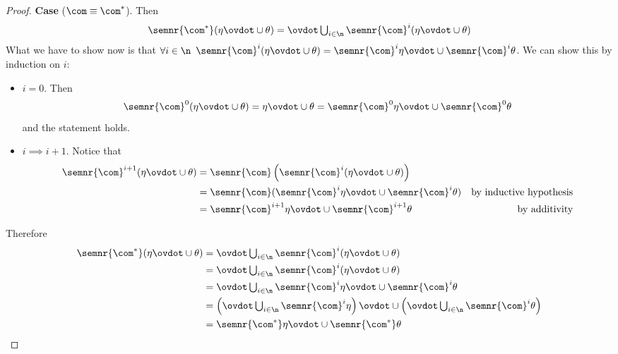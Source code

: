 \begin{proof}
  \noindent
  \textbf{Case}  (\(\com \equiv \com^*\)).
  Then
  \begin{equation*}
    \semnr{\com^*}(\eta\ovdot\cup\theta) = \textstyle \ovdot\bigcup_{i\in\n} \semnr{\com}^i(\eta \ovdot\cup \theta) \\
  \end{equation*}
  What we have to show now is that \(\forall i \in \n\)
  \(\semnr{\com}^i(\eta \ovdot\cup \theta) = \semnr{\com}^i \eta \ovdot\cup
  \semnr{\com}^i\theta\). We can show this by induction on \(i\):
  \begin{itemize}
  \item  \(i=0\). Then
    \begin{equation*}
      \semnr{\com}^0(\eta\ovdot\cup\theta) = \eta\ovdot\cup\theta = \semnr{\com}^0\eta \ovdot\cup \semnr{\com}^0\theta
    \end{equation*}
    and the statement holds.
  \item  \(i \implies i + 1\). Notice that
    \begin{align*}
      \semnr{\com}^{i+1}(\eta \ovdot\cup \theta) & = \semnr{\com}\left(\semnr{\com}^i(\eta \ovdot\cup \theta)\right) \\
                                                 & = \semnr{\com}(\semnr{\com}^i\eta \ovdot\cup \semnr{\com}^i\theta) & \text{by inductive hypothesis} \\
                                                 & = \semnr{\com}^{i+1}\eta \ovdot\cup \semnr{\com}^{i+1}\theta & \text{by additivity}
    \end{align*}
  \end{itemize}
  Therefore
  \begin{align*}
    \semnr{\com^*}(\eta\ovdot\cup\theta) & = \textstyle \ovdot\bigcup_{i\in\n} \semnr{\com}^i(\eta \ovdot\cup \theta) \\
                                         & = \textstyle \ovdot\bigcup_{i\in\n}\semnr{\com}^i(\eta \ovdot\cup \theta) \\
                                         & = \textstyle \ovdot\bigcup_{i\in\n}\semnr{\com}^i\eta \ovdot\cup \semnr{\com}^i\theta \\
                                         & = \left(\textstyle \ovdot\bigcup_{i\in\n} \semnr{\com}^i\eta\right) \ovdot\cup \left(\textstyle \ovdot\bigcup_{i\in\n} \semnr{\com}^i\theta\right) \\
                                         & = \semnr{\com^*} \eta \ovdot\cup \semnr{\com^*}\theta
  \end{align*}
\end{proof}


